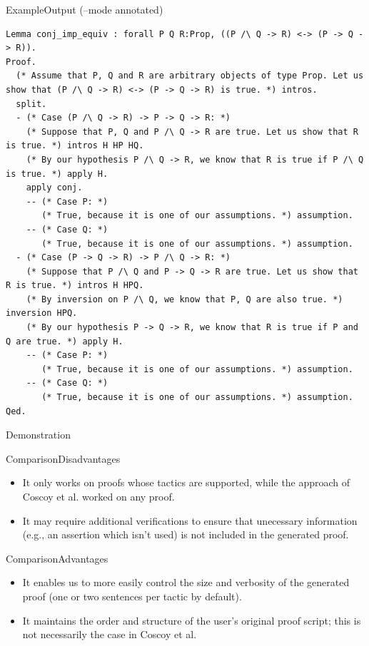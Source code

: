 \documentclass[pdf]{beamer}
\begin{document}
\begin{frame}[fragile]{Example}{Output (--mode annotated)}
\begin{adjustbox}{minipage=\linewidth,bgcolor=coqatoo-gray,trim=-3pt 5pt -3pt 5pt}
\begin{lstlisting}[label=listing:output]
Lemma conj_imp_equiv : forall P Q R:Prop, ((P /\ Q -> R) <-> (P -> Q -> R)).
Proof.
  (* Assume that P, Q and R are arbitrary objects of type Prop. Let us show that (P /\ Q -> R) <-> (P -> Q -> R) is true. *) intros.
  split.
  - (* Case (P /\ Q -> R) -> P -> Q -> R: *) 
    (* Suppose that P, Q and P /\ Q -> R are true. Let us show that R is true. *) intros H HP HQ.
    (* By our hypothesis P /\ Q -> R, we know that R is true if P /\ Q  is true. *) apply H.
    apply conj.
    -- (* Case P: *)
       (* True, because it is one of our assumptions. *) assumption.
    -- (* Case Q: *)
       (* True, because it is one of our assumptions. *) assumption.
  - (* Case (P -> Q -> R) -> P /\ Q -> R: *)
    (* Suppose that P /\ Q and P -> Q -> R are true. Let us show that R is true. *) intros H HPQ.
    (* By inversion on P /\ Q, we know that P, Q are also true. *) inversion HPQ.
    (* By our hypothesis P -> Q -> R, we know that R is true if P and Q are true. *) apply H.
    -- (* Case P: *)
       (* True, because it is one of our assumptions. *) assumption.
    -- (* Case Q: *)
       (* True, because it is one of our assumptions. *) assumption.
Qed.
\end{lstlisting}
\end{adjustbox}
\end{frame}


\begin{frame}
    \Huge \center Demonstration
\end{frame}

\begin{frame}{Comparison}{Disadvantages}
    \begin{itemize}
        \item{It only works on proofs whose tactics are supported, while the approach of Coscoy et al. worked on any proof.}
        \item{It may require additional verifications to ensure that unecessary information (e.g., an assertion which isn't used) is not included in the generated proof.}
    \end{itemize}
\end{frame}

\begin{frame}{Comparison}{Advantages}
    \begin{itemize}
        \item{It enables us to more easily control the size and verbosity of the generated proof (one or two sentences per tactic by default).}
        \item{It maintains the order and structure of the user's original proof script; this is not necessarily the case in Coscoy et al. }
      \end{itemize}
\end{frame}
\end{document}
